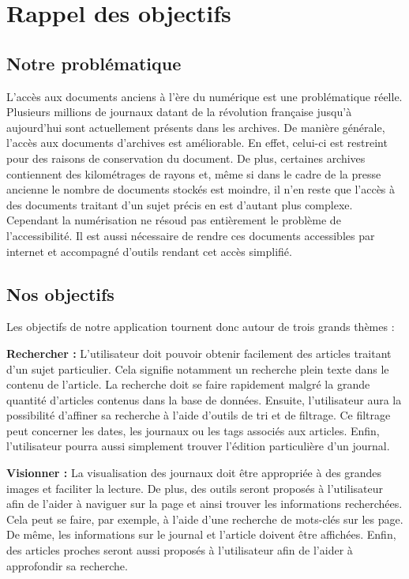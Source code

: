 \section{Rappel des objectifs}
\label{sec:rappel}

\subsection{Notre problématique}
	L’accès aux documents anciens à l’ère du numérique est une problématique réelle. Plusieurs millions de journaux datant de la révolution française jusqu’à aujourd’hui sont actuellement présents dans les archives. De manière générale, l’accès aux documents d’archives est améliorable. En effet, celui-ci est restreint pour des raisons de conservation du document. De plus, certaines archives contiennent des kilométrages de rayons et, même si dans le cadre de la presse ancienne le nombre de documents stockés est moindre, il n’en reste que l'accès à des documents traitant d'un sujet précis en est d'autant plus complexe. Cependant la numérisation ne résoud pas entièrement le problème de l’accessibilité. Il est aussi nécessaire de rendre ces documents accessibles par internet et accompagné d'outils rendant cet accès simplifié.

\subsection{Nos objectifs}

	Les objectifs de notre application tournent donc autour de trois grands thèmes :
	
	\textbf{Rechercher :} L'utilisateur doit pouvoir obtenir facilement des articles traitant d'un sujet particulier. Cela signifie notamment un recherche plein texte dans le contenu de l'article. La recherche doit se faire rapidement malgré la grande quantité d'articles contenus dans la base de données. Ensuite, l'utilisateur aura la possibilité d'affiner sa recherche à l'aide d'outils de tri et de filtrage. Ce filtrage peut concerner les dates, les journaux ou les tags associés aux articles. Enfin, l'utilisateur pourra aussi simplement trouver l'édition particulière d'un journal.
	
	\textbf{Visionner :} La visualisation des journaux doit être appropriée à des grandes images et faciliter la lecture. De plus, des outils seront proposés à l'utilisateur afin de l'aider à naviguer sur la page et ainsi trouver les informations recherchées. Cela peut se faire, par exemple, à l'aide d'une recherche de mots-clés sur les page. De même, les informations sur le journal et l'article doivent être affichées. Enfin, des articles proches seront aussi proposés à l'utilisateur afin de l'aider à approfondir sa recherche.

